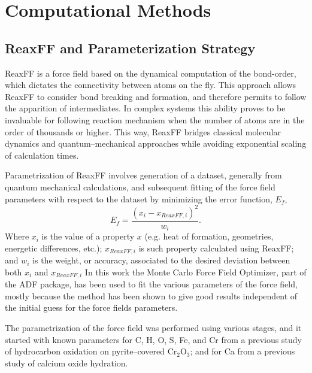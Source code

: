 \documentclass[journal=jpcafh,manuscript=article]{achemso}
\begin{document}
\section{Computational Methods}

\subsection{ReaxFF and Parameterization Strategy}
\label{sec:reaxff-strategy}

ReaxFF is a force field based on the dynamical computation of the bond-order, which dictates the connectivity between atoms on the fly.
This approach allows ReaxFF to consider bond breaking and formation, and therefore permits to follow the apparition of intermediates.
In complex systems this ability proves to be invaluable for following reaction mechanism when the number of atoms are in the order of thousands or higher.\cite{migliorati_development_2017,merinov_reaxff_2014,
raymand_reactive_2008,
shin_development_2015,
van_duin_reaxff_2008,
goddard_development_2006,
hubin_parameterization_2016,
senftle_reaxff_2016,
chenoweth_reaxff_2009,
chenoweth_reaxff_2008,
van_duin_reaxff_2008-1,
liu_reaxff-lg:_2011}
This way, ReaxFF bridges classical molecular dynamics and quantum--mechanical approaches while avoiding exponential scaling of calculation times.

Parametrization of ReaxFF involves generation of a dataset, generally from quantum mechanical calculations, and subsequent fitting of the force field parameters with respect to the dataset by minimizing the error function, $E_f$,
\begin{equation}
E_f = \frac{(x_{i} - x_{ReaxFF,i})^2}{w_i}.
\end{equation}
Where $x_{i}$ is the value of a property $x$ (e.g. heat of formation, geometries, energetic differences, etc.); $x_{ReaxFF,i}$ is such property calculated using ReaxFF; and $w_i$ is the weight, or accuracy, associated to the desired deviation between both $x_i$ and $x_{ReaxFF,i}$
In this work the Monte Carlo Force Field Optimizer,\cite{iype_parameterization_2013} part of the ADF package, has been used to fit the various parameters of the force field, mostly because the method has been shown to give good results independent of the initial guess for the force fields parameters.

The parametrization of the force field was performed using various stages, and it started with known parameters for C, H, O, S, Fe, and Cr from a previous study of hydrocarbon oxidation on pyrite--covered Cr$_2$O$_3$; \cite{shin_development_2015} and for Ca from a previous study of calcium oxide hydration. \cite{manzano_hydration_2012}
\end{document}
